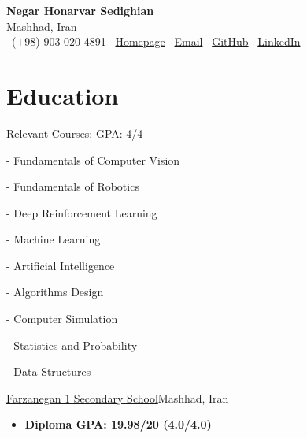 \documentclass[11pt,a4paper,sans]{moderncv}        %
\makeatletter
\newcommand{\header}{
    \begin{center}
        {\LARGE \textbf{\textcolor{headerblue}{Negar Honarvar Sedighian}}}\\[0.2cm]
        {\large Mashhad, Iran}\\[0.2cm]
        \faPhone\ (+98) 903 020 4891 \quad
        \faHome\ \href{https://negarhonarvar.github.io}{Homepage} \quad
        \faEnvelope\ \href{mailto:negarhonarvar.se@gmail.com}{Email} \quad
        \faGithub\ \href{https://github.com/negarhonarvar}{GitHub} \quad
        \faLinkedin\ \href{https://linkedin.com/in/negar-honarvar-sedighian}{LinkedIn}
    \end{center}
}
\makeatother
\begin{document}
\vspace*{-1.05mm}

\header
\vspace*{-10mm}
\section{Education}
\item{}

{}{Relevant Courses: GPA: 4/4}
\vspace{-1.0em}\begin{small}
 \begin{multicols}{3}
    \begin{itemize}
- Fundamentals of Computer Vision

- Fundamentals of Robotics

- Deep Reinforcement Learning 

- Machine Learning

- Artificial Intelligence

- Algorithms Design

- Computer Simulation

- Statistics and Probability 

- Data Structures 

    \end{itemize}
    \end{multicols}\end{small}
\item{
{\href{https://en.wikipedia.org/wiki/National_Organization_for_Development_of_Exceptional_Talents}{Farzanegan 1 Secondary School}}{Mashhad, Iran}{}{\vspace{3pt} 
\begin{itemize}
    \item \textbf{Diploma GPA: 19.98/20 (4.0/4.0)}
\end{itemize}
}}
\end{document}
